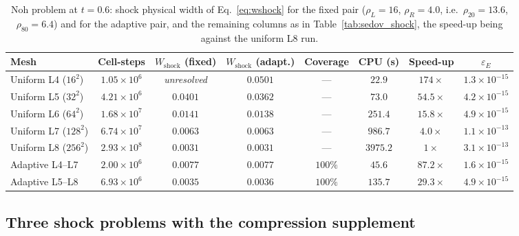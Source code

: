 \documentclass[a4paper]{cas-sc}
\begin{document}
\begin{table}[pos=htbp]
	\centering
	\caption{Noh problem at $t=0.6$: shock physical width of
	Eq.~\eqref{eq:wshock} for the fixed pair ($\rho_L=16$, $\rho_R=4.0$,
	i.e.\ $\rho_{20}=13.6$, $\rho_{80}=6.4$) and for the adaptive pair, and
	the remaining columns as in Table~\ref{tab:sedov_shock}, the speed-up
	being against the uniform L8 run.}
	\label{tab:noh_shock}
	\begin{tabular}{lccccccc}
		\hline
		Mesh & Cell-steps & $W_{\mathrm{shock}}$ (fixed) & $W_{\mathrm{shock}}$ (adapt.) & Coverage & CPU (s) & Speed-up & $\varepsilon_E$ \\
		\hline
		Uniform L4 ($16^2$)  & $1.05\times10^{6}$ & \emph{unresolved} & $0.0501$ & ---      & $22.9$   & $174\times$  & $1.3\times10^{-15}$ \\
		Uniform L5 ($32^2$)  & $4.21\times10^{6}$ & $0.0401$          & $0.0362$ & ---      & $73.0$   & $54.5\times$ & $4.2\times10^{-15}$ \\
		Uniform L6 ($64^2$)  & $1.68\times10^{7}$ & $0.0141$          & $0.0138$ & ---      & $251.4$  & $15.8\times$ & $4.9\times10^{-15}$ \\
		Uniform L7 ($128^2$) & $6.74\times10^{7}$ & $0.0063$          & $0.0063$ & ---      & $986.7$  & $4.0\times$  & $1.1\times10^{-13}$ \\
		Uniform L8 ($256^2$) & $2.93\times10^{8}$ & $0.0031$          & $0.0031$ & ---      & $3975.2$ & $1\times$    & $3.1\times10^{-13}$ \\
		Adaptive L4--L7      & $2.00\times10^{6}$ & $0.0077$          & $0.0077$ & $100\%$  & $45.6$   & $87.2\times$ & $1.6\times10^{-15}$ \\
		Adaptive L5--L8      & $6.93\times10^{6}$ & $0.0035$          & $0.0036$ & $100\%$  & $135.7$  & $29.3\times$ & $4.9\times10^{-15}$ \\
		\hline
	\end{tabular}
\end{table}

\subsection{Three shock problems with the compression supplement}
\label{sec:compression}
\end{document}

